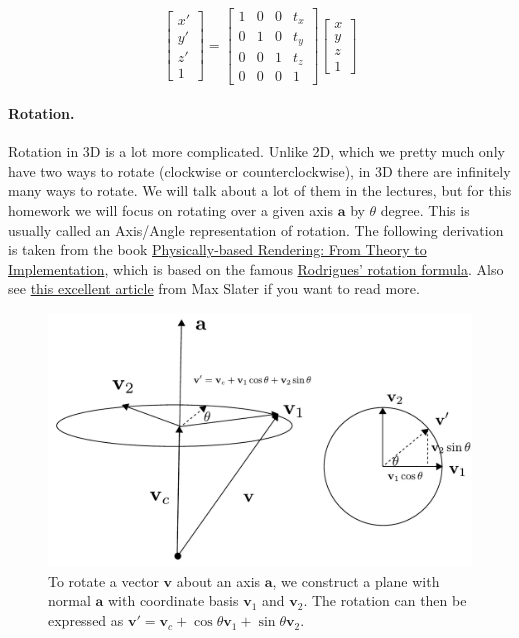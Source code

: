 \begin{equation}
\begin{bmatrix}
x' \\
y' \\
z' \\
1
\end{bmatrix}
=
\begin{bmatrix}
1 & 0 & 0 & t_x \\
0 & 1 & 0 & t_y \\
0 & 0 & 1 & t_z \\
0 & 0 & 0 & 1
\end{bmatrix}
\begin{bmatrix}
x \\
y \\
z \\
1
\end{bmatrix}
\end{equation}

\paragraph{Rotation.} Rotation in 3D is a lot more complicated. Unlike 2D, which we pretty much only have two ways to rotate (clockwise or counterclockwise), in 3D there are infinitely many ways to rotate. We will talk about a lot of them in the lectures, but for this homework we will focus on rotating over a given axis $\mathbf{a}$ by $\theta$ degree. This is usually called an Axis/Angle representation of rotation. The following derivation is taken from the book \href{https://www.pbr-book.org/3ed-2018/Geometry_and_Transformations/Transformations}{Physically-based Rendering: From Theory to Implementation}, which is based on the famous \href{https://en.wikipedia.org/wiki/Rodrigues%27_rotation_formula}{Rodrigues' rotation formula}. Also see \href{https://thenumb.at/Exponential-Rotations/}{this excellent article} from Max Slater if you want to read more.

\begin{figure}[h]
    \centering
    \includegraphics[width=0.5\linewidth]{imgs/rotate_axis.pdf}
    \caption{To rotate a vector $\mathbf{v}$ about an axis $\mathbf{a}$, we construct a plane with normal $\mathbf{a}$ with coordinate basis $\mathbf{v}_1$ and $\mathbf{v}_2$. The rotation can then be expressed as $\mathbf{v}' = \mathbf{v}_c + \cos\theta \mathbf{v}_1 + \sin\theta \mathbf{v}_2$.}
    \label{fig:rotate_axis}
\end{figure}


